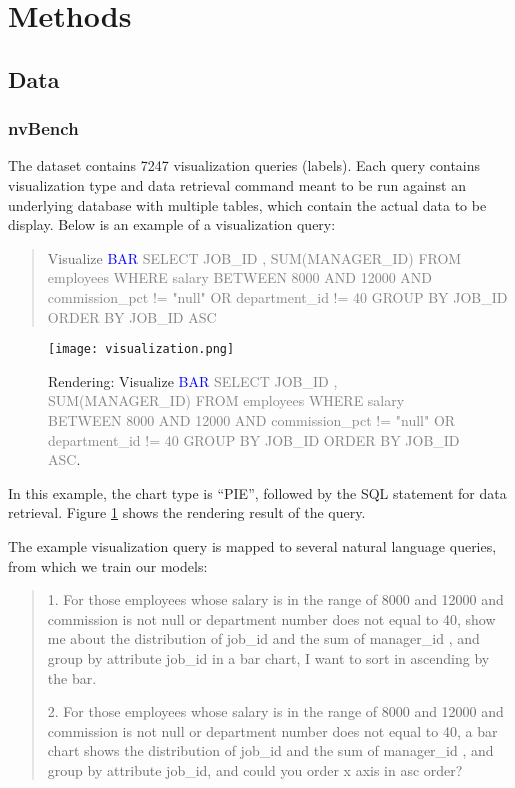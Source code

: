 \documentclass[
	a4paper, %
	10pt, %
	unnumberedsections, %
	twoside, %
]{t0003}
\newcommand{\blue}[1]{\textcolor{blue}{#1}}
\newcommand{\gray}[1]{\textcolor{gray}{#1}}
\begin{document}
\section{Methods}

\subsection{Data}

\subsubsection{nvBench}

The dataset contains 7247 visualization queries (labels). Each query contains visualization type and data retrieval command meant to be run against an underlying database with multiple tables, which contain the actual data to be display. Below is an example of a visualization query:

\begin{quote}
Visualize \blue{BAR} \gray{SELECT JOB\_ID , SUM(MANAGER\_ID) FROM employees WHERE salary BETWEEN 8000 AND 12000 AND commission\_pct != "null" OR department\_id != 40 GROUP BY JOB\_ID ORDER BY JOB\_ID ASC}
\end{quote}

\begin{figure}
	\texttt{[image: visualization.png]}
	\caption{Rendering: Visualize \blue{BAR} \gray{SELECT JOB\_ID , SUM(MANAGER\_ID) FROM employees WHERE salary BETWEEN 8000 AND 12000 AND commission\_pct != "null" OR department\_id != 40 GROUP BY JOB\_ID ORDER BY JOB\_ID ASC}.}
	\label{fig:visualization}
\end{figure}

In this example, the chart type is ``PIE'', followed by the SQL statement for data retrieval. Figure \ref{fig:visualization} shows the rendering result of the query.

The example visualization query is mapped to several natural language queries, from which we train our models:

\begin{quote}
1. For those employees whose salary is in the range of 8000 and 12000 and commission is not null or department number does not equal to 40, show me about the distribution of job\_id and the sum of manager\_id , and group by attribute job\_id in a bar chart, I want to sort in ascending by the bar.

2. For those employees whose salary is in the range of 8000 and 12000 and commission is not null or department number does not equal to 40, a bar chart shows the distribution of job\_id and the sum of manager\_id , and group by attribute job\_id, and could you order x axis in asc order?
\end{quote}
\end{document}
